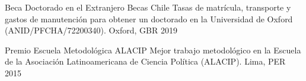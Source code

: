 \vspace{1mm}

\begin{cvhonors}
\cvhonor
{Beca Doctorado en el Extranjero Becas Chile} 
{Tasas de matrícula, transporte y gastos de manutención para obtener un doctorado en la Universidad de Oxford (ANID/PFCHA/72200340).} %
{Oxford, GBR}
{2019}
\end{cvhonors}

\vspace{1mm}





\begin{cvhonors}
\cvhonor
{Premio Escuela Metodológica ALACIP}
{Mejor trabajo metodológico en la Escuela de la Asociación Latinoamericana de Ciencia Política (ALACIP).}
{Lima, PER}
{2015}
\end{cvhonors}

\vspace{1mm}




